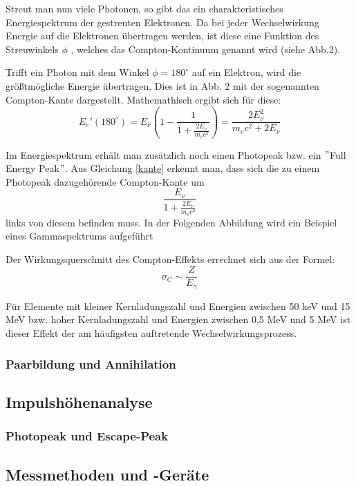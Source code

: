 Streut man nun viele Photonen, so gibt das ein charakteristisches Energiespektrum der gestreuten Elektronen. Da bei jeder Wechselwirkung Energie auf die Elektronen übertragen werden, ist diese eine Funktion des Streuwinkels $\phi$ , welches das Compton-Kontinuum genannt wird (siehe Abb.2).


Trifft ein Photon mit dem Winkel $\phi = 180^{\circ}$ auf ein Elektron, wird die größtmögliche Energie übertragen. Dies ist in Abb. 2 mit der sogenannten Compton-Kante dargestellt. Mathemathisch ergibt sich für diese:
	\begin{equation}
	\label{kante}
	E_{e}'(180^{\circ}) = E_{\nu} \left(1-\frac{1}{1+\frac{2E_{\nu}}{m_{e}c^{2}}}\right) = \frac{2E_{\nu}^{2}}{m_{e}c^{2} +2E_{\nu}}
	\end{equation}

Im Energiespektrum erhält man zusätzlich noch einen Photopeak bzw. ein $"$Full Energy Peak$"$. Aus Gleichung \eqref{kante} erkennt man, dass sich die zu einem Photopeak dazugehörende Compton-Kante um 
	\begin{equation}
	\frac{E_{\nu}}{1+\frac{2E_{\nu}}{m_{e}c^{2}}}
	\end{equation}
links von diesem befinden muss. In der Folgenden Abbildung wird ein Beispiel eines Gammaspektrums aufgeführt\\


Der Wirkungsquerschnitt des Compton-Effekts errechnet sich aus der Formel:
	\begin{equation}
	\sigma_{C} \sim \frac{Z}{E_{\gamma}}
	\end{equation}
	
Für Elemente mit kleiner Kernladungszahl und Energien zwischen 50 keV und 15 MeV bzw. hoher Kernladungszahl und Energien zwischen 0,5 MeV und 5 MeV ist dieser Effekt der am häufigsten auftretende Wechselwirkungsprozess.

\subsubsection*{Paarbildung und Annihilation}
\subsection{Impulshöhenanalyse}
\subsubsection*{Photopeak und Escape-Peak}
\subsection{Messmethoden und -Geräte}